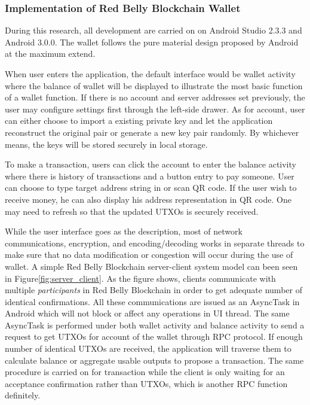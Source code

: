 \documentclass[12pt]{article}
\begin{document}
\subsubsection{Implementation of Red Belly Blockchain Wallet}

During this research, all development are carried on on Android Studio 2.3.3 and Android 3.0.0. The wallet follows the pure material design proposed by Android at the maximum extend.

When user enters the application, the default interface would be wallet activity where the balance of wallet will be displayed to illustrate the most basic function of a wallet function. If there is no account and server addresses set previously, the user may configure settings first through the left-side drawer. As for account, user can either choose to import a existing private key and let the application reconstruct the original pair or generate a new key pair randomly. By whichever means, the keys will be stored securely in local storage.

To make a transaction, users can click the account to enter the balance activity where there is history of transactions and a button entry to pay someone. User can choose to type target address string in or scan QR code. If the user wish to receive money, he can also display his address representation in QR code. One may need to refresh so that the updated UTXOs is securely received.

While the user interface goes as the description, most of network communications, encryption, and encoding/decoding works in separate threads to make sure that no data modification or congestion will occur during the use of wallet. A simple Red Belly Blockchain server-client system model can been seen in Figure\ref{fig:server_client}. As the figure shows, clients communicate with multiple \textit{participants} in Red Belly Blockchain in order to get adequate number of identical confirmations. All these communications are issued as an AsyncTask in Android which will not block or affect any operations in UI thread. The same AsyncTask is performed under both wallet activity and balance activity to send a request to get UTXOs for account of the wallet through RPC protocol. If enough number of identical UTXOs are received, the application will traverse them to calculate balance or aggregate usable outputs to propose a transaction. The same procedure is carried on for transaction while the client is only waiting  for an acceptance confirmation rather than UTXOs, which is another RPC function definitely.
\end{document}
